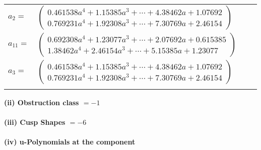 \documentclass[1p]{elsarticle_modified}
\theoremstyle{definition}
\begin{document}
\begin{tabular}{m{7pt} m{180pt} m{7pt} m{180pt} }
\flushright $a_{2}=$&$\begin{pmatrix}0.461538 a^{4}+1.15385 a^{3}+\cdots+4.38462 a+1.07692\\0.769231 a^{4}+1.92308 a^{3}+\cdots+7.30769 a+2.46154\end{pmatrix}$ \\
\flushright $a_{11}=$&$\begin{pmatrix}0.692308 a^{4}+1.23077 a^{3}+\cdots+2.07692 a+0.615385\\1.38462 a^{4}+2.46154 a^{3}+\cdots+5.15385 a+1.23077\end{pmatrix}$ \\
\flushright $a_{3}=$&$\begin{pmatrix}0.461538 a^{4}+1.15385 a^{3}+\cdots+4.38462 a+1.07692\\0.769231 a^{4}+1.92308 a^{3}+\cdots+7.30769 a+2.46154\end{pmatrix}$\\&\end{tabular}
\flushleft \textbf{(ii) Obstruction class $= -1$}\\~\\
\flushleft \textbf{(iii) Cusp Shapes $= -6$}\\~\\
\newpage\renewcommand{\arraystretch}{1}
\flushleft \textbf{(iv) u-Polynomials at the component}\newline \\
\end{document}
